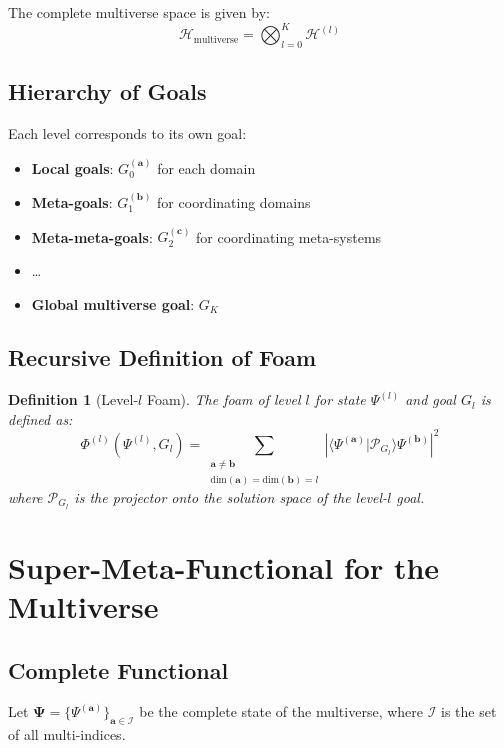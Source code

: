 \documentclass[12pt,a4paper]{article}
\newtheorem{definition}[theorem]{Definition}
\newcommand{\braket}[2]{\langle#1|#2\rangle}
\newcommand{\calH}{\mathcal{H}}
\newcommand{\calP}{\mathcal{P}}
\newcommand{\calI}{\mathcal{I}}
\newcommand{\bfPsi}{\mathbf{\Psi}}
\newcommand{\bfa}{\mathbf{a}}
\newcommand{\bfb}{\mathbf{b}}
\newcommand{\bfc}{\mathbf{c}}
\newcommand{\PhiFunc}{\Phi}
\begin{document}
The complete multiverse space is given by:
\begin{equation}
\calH_{\text{multiverse}} = \bigotimes_{l=0}^K \calH^{(l)}
\end{equation}

\subsection{Hierarchy of Goals}

Each level corresponds to its own goal:
\begin{itemize}
    \item \textbf{Local goals}: $G_0^{(\bfa)}$ for each domain
    \item \textbf{Meta-goals}: $G_1^{(\bfb)}$ for coordinating domains
    \item \textbf{Meta-meta-goals}: $G_2^{(\bfc)}$ for coordinating meta-systems
    \item \ldots
    \item \textbf{Global multiverse goal}: $G_K$
\end{itemize}

\subsection{Recursive Definition of Foam}

\begin{definition}[Level-$l$ Foam]
The foam of level $l$ for state $\Psi^{(l)}$ and goal $G_l$ is defined as:
\begin{equation}
\PhiFunc^{(l)}(\Psi^{(l)}, G_l) = \sum_{\substack{\bfa \neq \bfb \\ \text{dim}(\bfa)=\text{dim}(\bfb)=l}} 
\left| \braket{\Psi^{(\bfa)}}{\calP_{G_l}}{\Psi^{(\bfb)}} \right|^2
\end{equation}
where $\calP_{G_l}$ is the projector onto the solution space of the level-$l$ goal.
\end{definition}

\section{Super-Meta-Functional for the Multiverse}

\subsection{Complete Functional}

Let $\bfPsi = \{\Psi^{(\bfa)}\}_{\bfa\in\calI}$ be the complete state of the multiverse, where $\calI$ is the set of all multi-indices.
\end{document}
